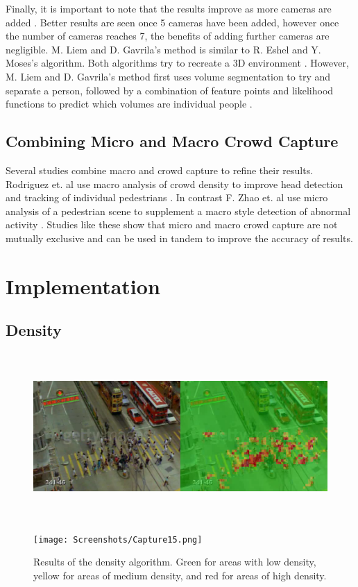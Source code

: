 \documentclass[12pt, onecolumn, conference]{IEEEtran}
\begin{document}
Finally, it is important to note that the results improve as more cameras are added \cite{R. Eshel}. Better results are seen once 5 cameras have been added, however once the number of cameras reaches 7, the benefits of adding further cameras are negligible.
M. Liem and D. Gavrila’s method is similar to R. Eshel and Y. Moses’s algorithm. Both algorithms try to recreate a 3D environment \cite{R. Eshel}\cite{M. Liem}. However, M. Liem and D. Gavrila’s method first uses volume segmentation to try and separate a person, followed by a combination of feature points and likelihood functions to predict which volumes are individual people \cite{M. Liem}.


\subsection{Combining Micro and Macro Crowd Capture}

Several studies combine macro and crowd capture to refine their results. Rodriguez et. al use macro analysis of crowd density to improve head detection and tracking of individual pedestrians \cite{M. Rodriguez}. In contrast F. Zhao et. al use micro analysis of a pedestrian scene to supplement a macro style detection of abnormal activity \cite{D. Zhang}. Studies like these show that micro and macro crowd capture are not mutually exclusive and can be used in tandem to improve the accuracy of results. 

\section{Implementation}

\subsection{Density}

\begin{figure}[!t]
\centering
\includegraphics[height=2.5in]{Screenshots/Density.png}

\texttt{[image: Screenshots/Capture15.png]}
\caption{Results of the density algorithm. Green for areas with low density, yellow for areas of medium density, and red for areas of high density.}
\label{Density}
\end{figure}
\end{document}
